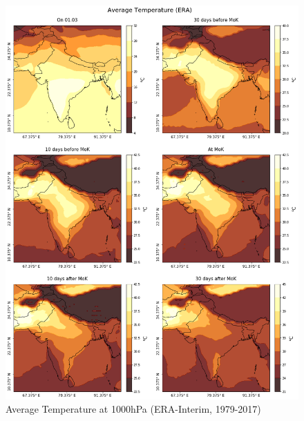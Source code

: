 \begin{figure}[h]
  \centering
  \includegraphics[width=\linewidth]{./99_appendix/img/t_avg}
  \caption{Average Temperature at 1000hPa (ERA-Interim, 1979-2017)}
  \label{apx:era_t}
\end{figure}

